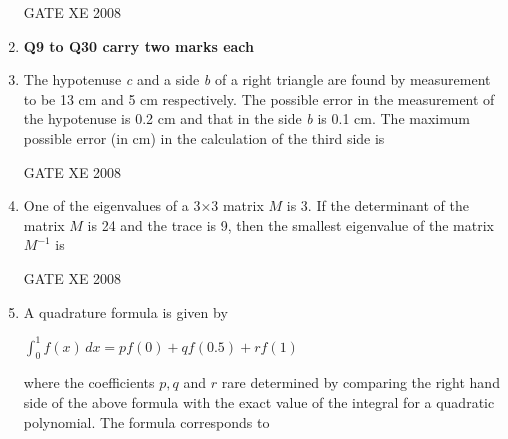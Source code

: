 \documentclass[12pt]{article}
\begin{document}
\begin{enumerate}[label=Q\arabic*.]
\begin{enumerate}[label=(\Alph*)]
\end{enumerate}

GATE XE 2008

\item []\textbf{Q9 to Q30 carry two marks each}
\item  The hypotenuse \textit{c} and a side \textit{b} of a right triangle are found by measurement to be 13 cm and 5 cm respectively. The possible error in the measurement of the hypotenuse is 0.2 cm and that in the side \textit{b} is 0.1 cm. The maximum possible error (in cm) in the calculation of the third side is

\begin{enumerate}[label=(\Alph*)]
\end{enumerate}

GATE XE 2008
\item One of the eigenvalues of a 3×3 matrix $M$ is 3. If the determinant of the matrix $M$ is 24 and the trace is 9, then the smallest eigenvalue of the matrix $M^{-1}$ is

\begin{enumerate}[label=(\Alph*)]
\end{enumerate}

GATE XE 2008
\item  A quadrature formula is given by\begin{center} $\int_{0}^{1} f(x) \,dx =pf(0) + qf(0.5) +rf(1)$\end{center} where the coefficients $p,q$ and $r$ rare determined by comparing the right hand side of the above formula with the exact value of the integral for a quadratic polynomial. The formula corresponds to


\end{enumerate}
\end{document}
